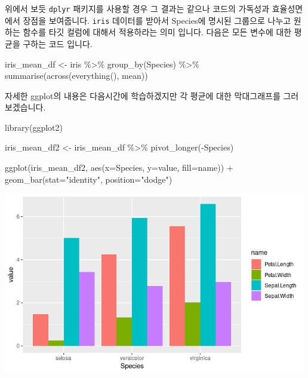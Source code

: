 \documentclass[
]{book}
\newenvironment{Shaded}{\begin{snugshade}}{\end{snugshade}}
\newcommand{\AttributeTok}[1]{\textcolor[rgb]{0.77,0.63,0.00}{#1}}
\newcommand{\FunctionTok}[1]{\textcolor[rgb]{0.00,0.00,0.00}{#1}}
\newcommand{\NormalTok}[1]{#1}
\newcommand{\OtherTok}[1]{\textcolor[rgb]{0.56,0.35,0.01}{#1}}
\newcommand{\SpecialCharTok}[1]{\textcolor[rgb]{0.00,0.00,0.00}{#1}}
\newcommand{\StringTok}[1]{\textcolor[rgb]{0.31,0.60,0.02}{#1}}
\begin{document}
위에서 보듯 \texttt{dplyr} 패키지를 사용할 경우 그 결과는 같으나 코드의 가독성과 효율성면에서 장점을 보여줍니다. \texttt{iris} 데이터를 받아서 Species에 명시된 그룹으로 나누고 원하는 함수를 타깃 컬럼에 대해서 적용하라는 의미 입니다. 다음은 모든 변수에 대한 평균을 구하는 코드 입니다.

\begin{Shaded}
\begin{Highlighting}[]
\NormalTok{iris\_mean\_df }\OtherTok{\textless{}{-}}\NormalTok{ iris }\SpecialCharTok{\%\textgreater{}\%} 
  \FunctionTok{group\_by}\NormalTok{(Species) }\SpecialCharTok{\%\textgreater{}\%} 
  \FunctionTok{summarise}\NormalTok{(}\FunctionTok{across}\NormalTok{(}\FunctionTok{everything}\NormalTok{(), mean))}
\end{Highlighting}
\end{Shaded}

자세한 ggplot의 내용은 다음시간에 학습하겠지만 각 평균에 대한 막대그래프를 그러보겠습니다.

\begin{Shaded}
\begin{Highlighting}[]
\FunctionTok{library}\NormalTok{(ggplot2)}

\NormalTok{iris\_mean\_df2 }\OtherTok{\textless{}{-}}\NormalTok{ iris\_mean\_df }\SpecialCharTok{\%\textgreater{}\%} 
  \FunctionTok{pivot\_longer}\NormalTok{(}\SpecialCharTok{{-}}\NormalTok{Species)}

\FunctionTok{ggplot}\NormalTok{(iris\_mean\_df2, }\FunctionTok{aes}\NormalTok{(}\AttributeTok{x=}\NormalTok{Species, }\AttributeTok{y=}\NormalTok{value, }\AttributeTok{fill=}\NormalTok{name)) }\SpecialCharTok{+}
  \FunctionTok{geom\_bar}\NormalTok{(}\AttributeTok{stat=}\StringTok{"identity"}\NormalTok{, }\AttributeTok{position=}\StringTok{"dodge"}\NormalTok{)}
\end{Highlighting}
\end{Shaded}

\includegraphics[width=5.20833in,height=\textheight]{images/08/Rplot01.png}
\end{document}

